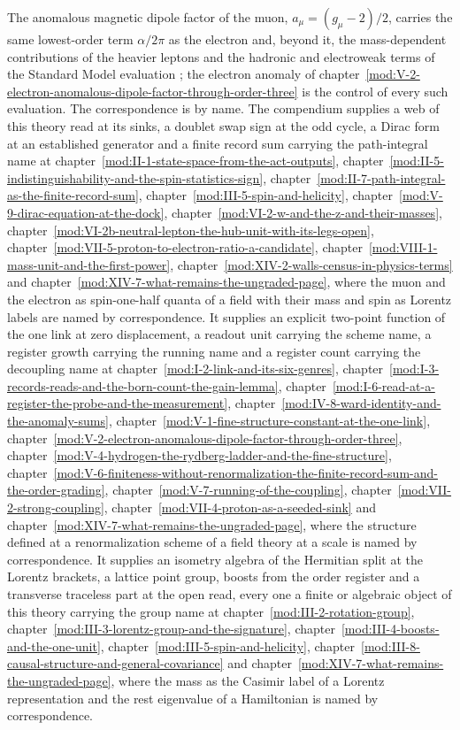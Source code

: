 \begin{chbridge}The anomalous magnetic dipole factor of the muon, $a_{\mu} = (g_{\mu} - 2)/2$, carries the same lowest-order term $\alpha/2\pi$ as the electron \cite{Schwinger1948} and, beyond it, the mass-dependent contributions of the heavier leptons and the hadronic and electroweak terms of the Standard Model evaluation \cite{Aoyama2020}; the electron anomaly of chapter~\ref{mod:V-2-electron-anomalous-dipole-factor-through-order-three} is the control of every such evaluation. The correspondence is by name. The compendium supplies a web of this theory read at its sinks, a doublet swap sign at the odd cycle, a Dirac form at an established generator and a finite record sum carrying the path-integral name at chapter~\ref{mod:II-1-state-space-from-the-act-outputs}, chapter~\ref{mod:II-5-indistinguishability-and-the-spin-statistics-sign}, chapter~\ref{mod:II-7-path-integral-as-the-finite-record-sum}, chapter~\ref{mod:III-5-spin-and-helicity}, chapter~\ref{mod:V-9-dirac-equation-at-the-dock}, chapter~\ref{mod:VI-2-w-and-the-z-and-their-masses}, chapter~\ref{mod:VI-2b-neutral-lepton-the-hub-unit-with-its-legs-open}, chapter~\ref{mod:VII-5-proton-to-electron-ratio-a-candidate}, chapter~\ref{mod:VIII-1-mass-unit-and-the-first-power}, chapter~\ref{mod:XIV-2-walls-census-in-physics-terms} and chapter~\ref{mod:XIV-7-what-remains-the-ungraded-page}, where the muon and the electron as spin-one-half quanta of a field with their mass and spin as Lorentz labels are named by correspondence. It supplies an explicit two-point function of the one link at zero displacement, a readout unit carrying the scheme name, a register growth carrying the running name and a register count carrying the decoupling name at chapter~\ref{mod:I-2-link-and-its-six-genres}, chapter~\ref{mod:I-3-records-reads-and-the-born-count-the-gain-lemma}, chapter~\ref{mod:I-6-read-at-a-register-the-probe-and-the-measurement}, chapter~\ref{mod:IV-8-ward-identity-and-the-anomaly-sums}, chapter~\ref{mod:V-1-fine-structure-constant-at-the-one-link}, chapter~\ref{mod:V-2-electron-anomalous-dipole-factor-through-order-three}, chapter~\ref{mod:V-4-hydrogen-the-rydberg-ladder-and-the-fine-structure}, chapter~\ref{mod:V-6-finiteness-without-renormalization-the-finite-record-sum-and-the-order-grading}, chapter~\ref{mod:V-7-running-of-the-coupling}, chapter~\ref{mod:VII-2-strong-coupling}, chapter~\ref{mod:VII-4-proton-as-a-seeded-sink} and chapter~\ref{mod:XIV-7-what-remains-the-ungraded-page}, where the structure defined at a renormalization scheme of a field theory at a scale is named by correspondence. It supplies an isometry algebra of the Hermitian split at the Lorentz brackets, a lattice point group, boosts from the order register and a transverse traceless part at the open read, every one a finite or algebraic object of this theory carrying the group name at chapter~\ref{mod:III-2-rotation-group}, chapter~\ref{mod:III-3-lorentz-group-and-the-signature}, chapter~\ref{mod:III-4-boosts-and-the-one-unit}, chapter~\ref{mod:III-5-spin-and-helicity}, chapter~\ref{mod:III-8-causal-structure-and-general-covariance} and chapter~\ref{mod:XIV-7-what-remains-the-ungraded-page}, where the mass as the Casimir label of a Lorentz representation and the rest eigenvalue of a Hamiltonian is named by correspondence.\end{chbridge}

